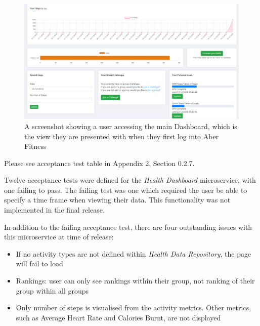 \begin{figure}[H]
    \centering
    \includegraphics[width=\textwidth]{Images/service_dashboard.png}
    \caption{A screenshot showing a user accessing the main Dashboard, which is the view they are presented with when they first log into Aber Fitness}
\end{figure}

Please see acceptance test table in Appendix 2, Section 0.2.7.

Twelve acceptance tests were defined for the \textit{Health Dashboard} microservice, with one failing to pass. The failing test was one which required the user be able to specify a time frame when viewing their data. This functionality was not implemented in the final release.

In addition to the failing acceptance test, there are four outstanding issues with this microservice at time of release:

\begin{itemize}

	\item If no activity types are not defined within \textit{Health Data Repository}, the page will fail to load

	\item Rankings: user can only see rankings within their group, not ranking of their group within all groups
	
	\item Only number of steps is visualised from the activity metrics. Other metrics, such as Average Heart Rate and Calories Burnt, are not displayed

\end{itemize}
